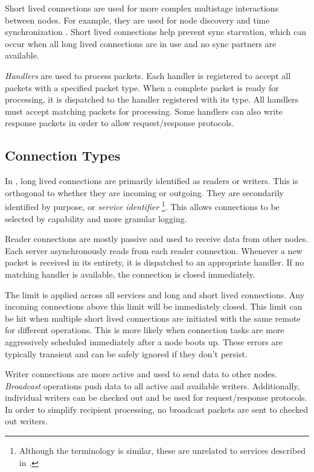 Short lived connections are used for more complex multistage interactions between nodes.
For example, they are used for node discovery  and time synchronization .
Short lived connections help prevent sync starvation, which can occur when all long lived connections are in use and no sync partners are available.

\emph{Handlers} are used to process packets.
Each handler is registered to accept all packets with a specified packet type.
When a complete packet is ready for processing, it is dispatched to the handler registered with its type.
All handlers must accept matching packets for processing.
Some handlers can also write response packets in order to allow request/response protocols.

\subsection{Connection Types}

In \codename, long lived connections are primarily identified as readers or writers.
This is orthogonal to whether they are incoming or outgoing.
They are secondarily identified by purpose, or \emph{service identifier}
\footnote{Although the terminology is similar, these are unrelated to services described in .}.
This allows connections to be selected by capability and more granular logging.

Reader connections are mostly passive and used to receive data from other nodes.
Each server asynchronously reads from each reader connection.
Whenever a new packet is received in its entirety, it is dispatched to an appropriate handler.
If no matching handler is available, the connection is closed immediately.

The  limit is applied across all services and long and short lived connections.
Any incoming connections above this limit will be immediately closed.
This limit can be hit when multiple short lived connections are initiated with the same remote for different operations.
This is more likely when connection tasks are more aggressively scheduled immediately after a node boots up.
These errors are typically transient and can be safely ignored if they don't persist.

Writer connections are more active and used to send data to other nodes.
\emph{Broadcast} operations push data to all active and available writers.
Additionally, individual writers can be checked out and be used for request/response protocols.
In order to simplify recipient processing, no broadcast packets are sent to checked out writers.

